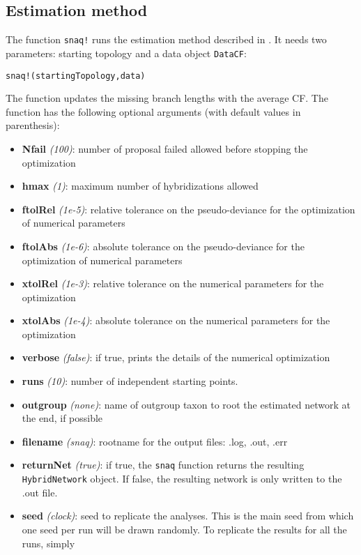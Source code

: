 \documentclass[12pt]{article}
\begin{document}
\subsection{Estimation method}
The function \texttt{snaq!} runs the estimation method described in
\citet{Solis-Lemus2015}. It needs two parameters: starting
topology and a data object \texttt{DataCF}:
\begin{lstlisting}
snaq!(startingTopology,data)
\end{lstlisting}
The function updates the missing branch lengths with the average CF.
The function has the following optional arguments (with default values in parenthesis):
\begin{itemize}
\item \textbf{Nfail} \textit{(100)}: number of proposal failed allowed before
  stopping the optimization
\item \textbf{hmax} \textit{(1)}: maximum number of hybridizations
  allowed
\item \textbf{ftolRel} \textit{(1e-5)}: relative tolerance on the pseudo-deviance for the
optimization of numerical parameters
\item \textbf{ftolAbs} \textit{(1e-6)}: absolute tolerance on the
  pseudo-deviance for the optimization of numerical parameters
\item \textbf{xtolRel} \textit{(1e-3)}: relative tolerance on the
  numerical parameters for the optimization
\item \textbf{xtolAbs} \textit{(1e-4)}: absolute tolerance on the
  numerical parameters for the optimization
\item \textbf{verbose} \textit{(false)}: if true, prints the details
  of the numerical optimization
\item \textbf{runs} \textit{(10)}: number of independent starting
  points.
\item \textbf{outgroup} \textit{(none)}: name of outgroup taxon to root the estimated
network at the end, if possible
\item \textbf{filename} \textit{(snaq)}: rootname for the output files: .log, .out, .err
\item \textbf{returnNet} \textit{(true)}: if true, the \texttt{snaq} function
  returns the resulting \texttt{HybridNetwork} object. If false, the
  resulting network is only written to the .out file.
\item \textbf{seed} \textit{(clock)}: seed to replicate the
  analyses. This is the main seed from which one seed per run will be
  drawn randomly. To replicate the results for all the runs, simply

\end{itemize}
\end{document}
